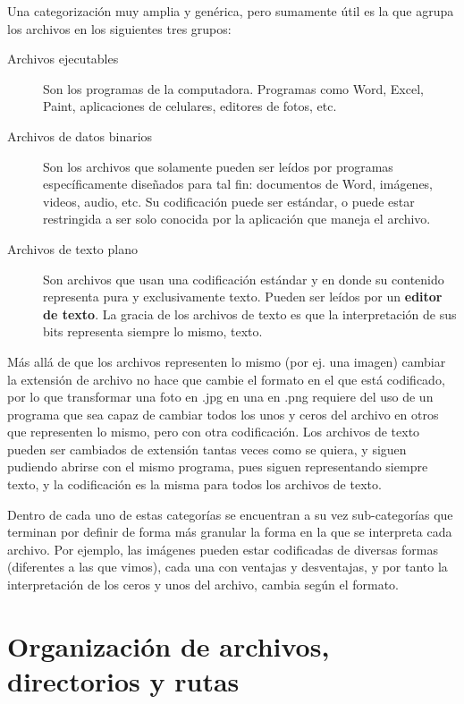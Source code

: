\vspace{0.5cm}
Una categorización muy amplia y genérica, pero sumamente útil es la que agrupa
los archivos en los siguientes tres grupos:

\begin{description}
    \item[Archivos ejecutables]
        Son los programas de la computadora. Programas como Word, Excel, Paint,
        aplicaciones de celulares, editores de fotos, etc.
    \item[Archivos de datos binarios]
        Son los archivos que solamente pueden ser leídos por programas
        específicamente diseñados para tal fin: documentos de Word, imágenes,
        videos, audio, etc. Su codificación puede ser estándar, o puede estar
        restringida a ser solo conocida por la aplicación que maneja el archivo.
    \item[Archivos de texto plano]
        Son archivos que usan una codificación estándar y en donde su contenido
        representa pura y exclusivamente texto. Pueden ser leídos por un
        \textbf{editor de texto}. La gracia de los archivos de texto es que la
        interpretación de sus bits representa siempre lo mismo, texto.
\end{description}

\begin{knowwhat}
Más allá de que los archivos representen lo mismo (por ej. una imagen) cambiar
la extensión de archivo no hace que cambie el formato en el que está codificado,
por lo que transformar una foto en .jpg en una en .png requiere del uso de un
programa que sea capaz de cambiar todos los unos y ceros del archivo en otros
que representen lo mismo, pero con otra codificación. Los archivos de texto
pueden ser cambiados de extensión tantas veces como se quiera, y siguen pudiendo
abrirse con el mismo programa, pues siguen representando siempre texto, y la
codificación es la misma para todos los archivos de texto.
\end{knowwhat}

Dentro de cada uno de estas categorías se encuentran a su vez sub-categorías que
terminan por definir de forma más granular la forma en la que se interpreta cada
archivo. Por ejemplo, las imágenes pueden estar codificadas de diversas formas
(diferentes a las que vimos), cada una con ventajas y desventajas, y por tanto
la interpretación de los ceros y unos del archivo, cambia según el formato.

\section{Organización de archivos, directorios y rutas}
\label{chap:informatica:sec:sistema_archivos}

